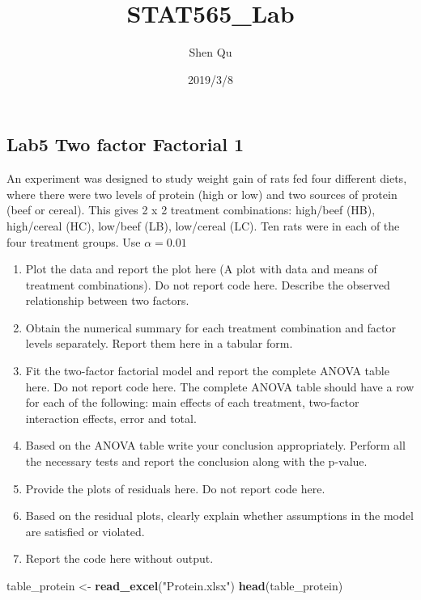 \documentclass[]{article}
\title{STAT565\_Lab}
\author{Shen Qu}
\date{2019/3/8}
\newenvironment{Shaded}{\begin{snugshade}}{\end{snugshade}}
\newcommand{\KeywordTok}[1]{\textcolor[rgb]{0.13,0.29,0.53}{\textbf{#1}}}
\newcommand{\NormalTok}[1]{#1}
\newcommand{\StringTok}[1]{\textcolor[rgb]{0.31,0.60,0.02}{#1}}
\begin{document}
\maketitle

\hypertarget{lab5-two-factor-factorial-1}{%
\subsection{Lab5 Two factor Factorial
1}\label{lab5-two-factor-factorial-1}}

An experiment was designed to study weight gain of rats fed four
different diets, where there were two levels of protein (high or low)
and two sources of protein (beef or cereal). This gives 2 x 2 treatment
combinations: high/beef (HB), high/cereal (HC), low/beef (LB),
low/cereal (LC). Ten rats were in each of the four treatment groups. Use
\(\alpha=0.01\)

\begin{enumerate}
\def\labelenumi{(\alph{enumi})}
\item
  Plot the data and report the plot here (A plot with data and means of
  treatment combinations). Do not report code here. Describe the
  observed relationship between two factors.
\item
  Obtain the numerical summary for each treatment combination and factor
  levels separately. Report them here in a tabular form.
\item
  Fit the two-factor factorial model and report the complete ANOVA table
  here. Do not report code here. The complete ANOVA table should have a
  row for each of the following: main effects of each treatment,
  two-factor interaction effects, error and total.
\item
  Based on the ANOVA table write your conclusion appropriately. Perform
  all the necessary tests and report the conclusion along with the
  p-value.
\item
  Provide the plots of residuals here. Do not report code here.
\item
  Based on the residual plots, clearly explain whether assumptions in
  the model are satisfied or violated.
\item
  Report the code here without output.
\end{enumerate}

\begin{Shaded}
\begin{Highlighting}[]
\NormalTok{table_protein <-}\StringTok{ }\KeywordTok{read_excel}\NormalTok{(}\StringTok{"Protein.xlsx"}\NormalTok{)}
\KeywordTok{head}\NormalTok{(table_protein)}
\end{Highlighting}
\end{Shaded}
\end{document}
